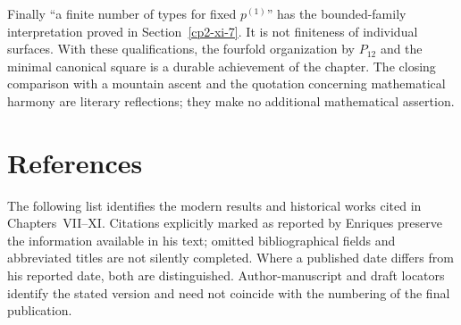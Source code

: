 Finally ``a finite number of types for fixed \(p^{(1)}\)'' has the bounded-family interpretation proved in Section~\ref{cp2-xi-7}. It is not finiteness of individual surfaces. With these qualifications, the fourfold organization by \(P_{12}\) and the minimal canonical square is a durable achievement of the chapter. The closing comparison with a mountain ascent and the quotation concerning mathematical harmony are literary reflections; they make no additional mathematical assertion.

\section*{References}

The following list identifies the modern results and historical works cited in Chapters~VII--XI. Citations explicitly marked as reported by Enriques preserve the information available in his text; omitted bibliographical fields and abbreviated titles are not silently completed. Where a published date differs from his reported date, both are distinguished. Author-manuscript and draft locators identify the stated version and need not coincide with the numbering of the final publication.

